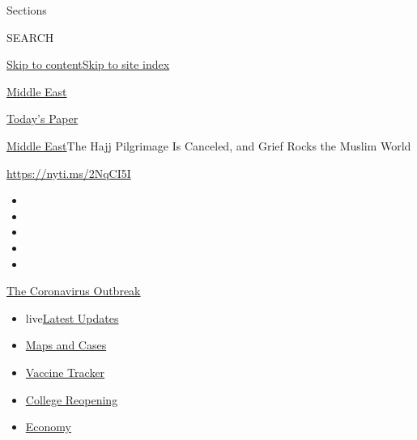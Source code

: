 Sections

SEARCH

\protect\hyperlink{site-content}{Skip to
content}\protect\hyperlink{site-index}{Skip to site index}

\href{https://www.nytimes.com/section/world/middleeast}{Middle East}

\href{https://myaccount.nytimes.com/auth/login?response_type=cookie\&client_id=vi}{}

\href{https://www.nytimes.com/section/todayspaper}{Today's Paper}

\href{/section/world/middleeast}{Middle East}\textbar{}The Hajj
Pilgrimage Is Canceled, and Grief Rocks the Muslim World

\url{https://nyti.ms/2NqCI5I}

\begin{itemize}
\item
\item
\item
\item
\item
\end{itemize}

\href{https://www.nytimes.com/news-event/coronavirus?action=click\&pgtype=Article\&state=default\&region=TOP_BANNER\&context=storylines_menu}{The
Coronavirus Outbreak}

\begin{itemize}
\tightlist
\item
  live\href{https://www.nytimes.com/2020/08/04/world/coronavirus-cases.html?action=click\&pgtype=Article\&state=default\&region=TOP_BANNER\&context=storylines_menu}{Latest
  Updates}
\item
  \href{https://www.nytimes.com/interactive/2020/us/coronavirus-us-cases.html?action=click\&pgtype=Article\&state=default\&region=TOP_BANNER\&context=storylines_menu}{Maps
  and Cases}
\item
  \href{https://www.nytimes.com/interactive/2020/science/coronavirus-vaccine-tracker.html?action=click\&pgtype=Article\&state=default\&region=TOP_BANNER\&context=storylines_menu}{Vaccine
  Tracker}
\item
  \href{https://www.nytimes.com/2020/08/02/us/covid-college-reopening.html?action=click\&pgtype=Article\&state=default\&region=TOP_BANNER\&context=storylines_menu}{College
  Reopening}
\item
  \href{https://www.nytimes.com/live/2020/08/04/business/stock-market-today-coronavirus?action=click\&pgtype=Article\&state=default\&region=TOP_BANNER\&context=storylines_menu}{Economy}
\end{itemize}


